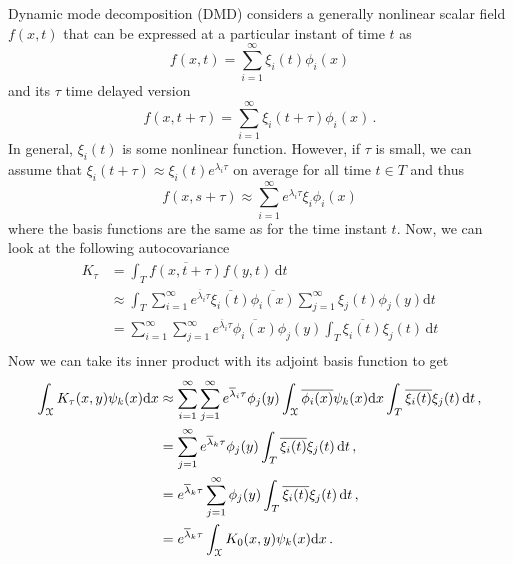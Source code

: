 \documentclass[10pt]{article}
\begin{document}
Dynamic mode decomposition (DMD) considers a generally nonlinear scalar field $f(x,t)$ that can be expressed at a particular instant of time $t$ as
\begin{equation}
	f(x,t) = \sum_{i=1}^\infty \xi_i(t) \phi_i(x)
\end{equation}
and its $\tau$ time delayed version %
\begin{equation}
		f(x,t+\tau) = \sum_{i=1}^\infty \xi_i(t+\tau) \phi_i(x)\,.
\end{equation}
In general, $\xi_i(t)$ is some nonlinear function.
However, if $\tau$ is small, we can assume that $\xi_i (t+\tau) \approx \xi_i(t) e^{\lambda_i \tau}$ on average for all time $t\in T$ and thus
\begin{equation}
	f(x,s+\tau) \approx \sum_{i=1}^\infty e^{\lambda_i\tau} \xi_i \phi_i(x)
\end{equation}
where the basis functions are the same as for the time instant $t$.
Now, we can look at the following autocovariance
\begin{equation}
\begin{aligned}
	K_\tau &= \int_T \overline{f(x, t+\tau)} f(y, t)\, \mathrm{d} t\\
	&\approx \int_T \sum_{i=1}^\infty e^{\overline \lambda_i\tau} \overline{\xi_i (t)} \overline{\phi_i(x)} \sum_{j=1}^\infty \xi_j (t) \phi_j(y) \mathrm{d} t\\
	&= \sum_{i=1}^\infty \sum_{j=1}^\infty  e^{\overline \lambda_i\tau}  \overline{\phi_i(x)}\phi_j(y) \int_T \overline {\xi_i(t)} \xi_j(t)\, \mathrm{d} t\\
\end{aligned}
\end{equation}
Now we can take its inner product with its adjoint basis function to get 
\begin{equation}
\begin{aligned}
	\int_{\cal X} K_\tau (x, y) \psi_k(x) \mathrm{d} x	
	&\approx \sum_{i=1}^\infty \sum_{j=1}^\infty  e^{\overline \lambda_i\tau}  \phi_j(y) \int_{\cal X} \overline{\phi_i(x)} \psi_k(x) \mathrm{d} x \int_T \overline {\xi_i(t)} \xi_j(t)\, \mathrm{d} t\,,\\
	&= \sum_{j=1}^\infty  e^{\overline \lambda_k\tau}  \phi_j(y) \int_T \overline {\xi_i(t)} \xi_j(t)\, \mathrm{d} t\,,\\
	&=  e^{\overline \lambda_k\tau} \sum_{j=1}^\infty  \phi_j(y) \int_T \overline {\xi_i(t)} \xi_j(t)\, \mathrm{d} t\,,\\
	& =  e^{\overline \lambda_k\tau} \int_{\cal X} K_0(x, y) \psi_k(x) \mathrm{d} x\,.
\end{aligned}
\end{equation}
\end{document}
